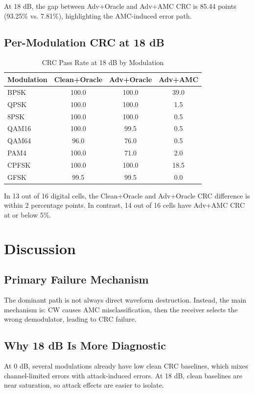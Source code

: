 At 18 dB, the gap between Adv+Oracle and Adv+AMC CRC is 85.44 points (93.25\% vs. 7.81\%),
highlighting the AMC-induced error path.

\subsection{Per-Modulation CRC at 18 dB}
\begin{table}[t]
\caption{CRC Pass Rate at 18 dB by Modulation}
\label{tab:mod18}
\centering
\begin{tabular}{lccc}
\toprule
Modulation & Clean+Oracle & Adv+Oracle & Adv+AMC \\
\midrule
BPSK  & 100.0 & 100.0 & 39.0 \\
QPSK  & 100.0 & 100.0 & 1.5 \\
8PSK  & 100.0 & 100.0 & 0.5 \\
QAM16 & 100.0 & 99.5  & 0.5 \\
QAM64 & 96.0  & 76.0  & 0.5 \\
PAM4  & 100.0 & 71.0  & 2.0 \\
CPFSK & 100.0 & 100.0 & 18.5 \\
GFSK  & 99.5  & 99.5  & 0.0 \\
\bottomrule
\end{tabular}
\end{table}

In 13 out of 16 digital cells, the Clean+Oracle and Adv+Oracle CRC difference is within
2 percentage points. In contrast, 14 out of 16 cells have Adv+AMC CRC at or below 5\%.

\section{Discussion}
\subsection{Primary Failure Mechanism}
The dominant path is not always direct waveform destruction. Instead, the main mechanism is:
CW causes AMC misclassification, then the receiver selects the wrong demodulator, leading to
CRC failure.

\subsection{Why 18 dB Is More Diagnostic}
At 0 dB, several modulations already have low clean CRC baselines, which mixes channel-limited
errors with attack-induced errors. At 18 dB, clean baselines are near saturation, so attack
effects are easier to isolate.

